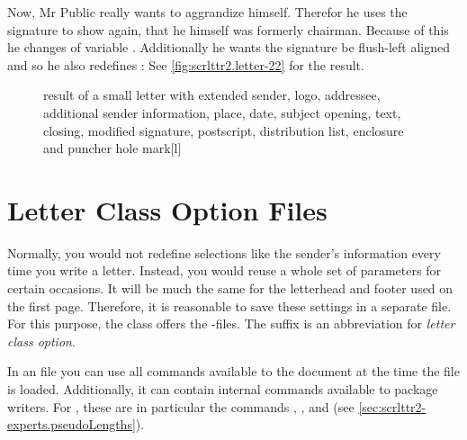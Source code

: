 \begin{Example}
  Now, Mr Public really wants to aggrandize himself. Therefor he uses the
  signature to show again, that he himself was formerly chairman. Because of
  this he changes  of variable
  . Additionally he wants the signature be flush-left
  aligned and so he also redefines :%
  See \autoref{fig:scrlttr2.letter-22} for the result.
  \begin{figure}
    \setcapindent{0pt}%
    \begin{captionbeside}
      {result of a small letter with extended sender, logo, addressee,
        additional sender information, place, date, subject opening, text,
        closing, modified signature, postscript, distribution list, enclosure
        and puncher hole mark}[l]
    \end{captionbeside}
    \label{fig:scrlttr2.letter-22}
  \end{figure}
\end{Example}
%
\EndIndexGroup
%
\EndIndexGroup


\section{Letter Class Option Files}
%
\BeginIndexGroup
{}%
%
%

Normally, you would not redefine selections like the sender's information
every time you write a letter. Instead, you would reuse a whole set of
parameters for certain occasions. It will be much the same for the letterhead
and footer used on the first page. Therefore, it is reasonable to save these
settings in a separate file. For this purpose, the  class
offers the -files. The  suffix is an abbreviation for
\emph{\emph{l}etter \emph{c}lass \emph{o}ption}.

In an  file you can use all commands available to the document at
the time the  file is loaded.  Additionally, it can contain internal
commands available to package writers. For , these are in
particular the commands ,
, and
 (see
\autoref{sec:scrlttr2-experts.pseudoLengths}).

